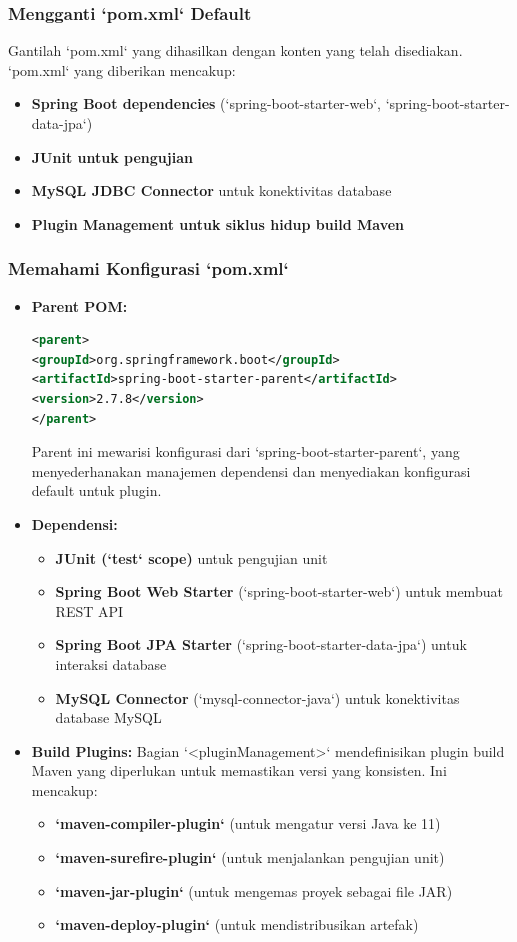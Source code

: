 \subsubsection{Mengganti `pom.xml` Default}
Gantilah `pom.xml` yang dihasilkan dengan konten yang telah disediakan. `pom.xml` yang diberikan mencakup:

\begin{itemize}
\item \textbf{Spring Boot dependencies} (`spring-boot-starter-web`, `spring-boot-starter-data-jpa`)
\item \textbf{JUnit untuk pengujian}
\item \textbf{MySQL JDBC Connector} untuk konektivitas database
\item \textbf{Plugin Management untuk siklus hidup build Maven}
\end{itemize}

\subsubsection{Memahami Konfigurasi `pom.xml`}

\begin{itemize}
\item \textbf{Parent POM:}
\begin{lstlisting}[language=xml]
<parent>
<groupId>org.springframework.boot</groupId>
<artifactId>spring-boot-starter-parent</artifactId>
<version>2.7.8</version>
</parent>
\end{lstlisting}
Parent ini mewarisi konfigurasi dari `spring-boot-starter-parent`, yang menyederhanakan manajemen dependensi dan menyediakan konfigurasi default untuk plugin.

\item \textbf{Dependensi:}
\begin{itemize}
\item \textbf{JUnit (`test` scope)} untuk pengujian unit
\item \textbf{Spring Boot Web Starter} (`spring-boot-starter-web`) untuk membuat REST API
\item \textbf{Spring Boot JPA Starter} (`spring-boot-starter-data-jpa`) untuk interaksi database
\item \textbf{MySQL Connector} (`mysql-connector-java`) untuk konektivitas database MySQL
\end{itemize}

\item \textbf{Build Plugins:}
Bagian `<pluginManagement>` mendefinisikan plugin build Maven yang diperlukan untuk memastikan versi yang konsisten. Ini mencakup:
\begin{itemize}
\item \textbf{`maven-compiler-plugin`} (untuk mengatur versi Java ke 11)
\item \textbf{`maven-surefire-plugin`} (untuk menjalankan pengujian unit)
\item \textbf{`maven-jar-plugin`} (untuk mengemas proyek sebagai file JAR)
\item \textbf{`maven-deploy-plugin`} (untuk mendistribusikan artefak)
\end{itemize}
\end{itemize}


